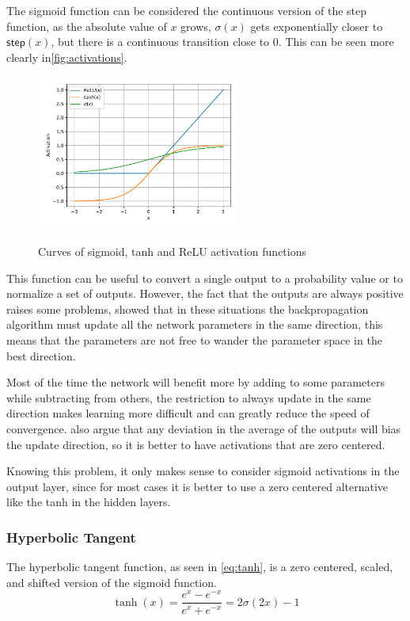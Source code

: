 The sigmoid function can be considered the continuous version of the step function, as the absolute value of $x$ grows, $\sigma(x)$ gets exponentially closer to $\mathsf{step}(x)$, but there is a continuous transition close to $0$. This can be seen more clearly in\autoref{fig:activations}.
\begin{figure}[hbt]
    \centering
    \caption{Curves of sigmoid, tanh and ReLU activation functions}
    \includegraphics[width=0.6\textwidth]{chapters/NeuralNets/figures/Activations.pdf}
    \label{fig:activations}
\end{figure}

This function can be useful to convert a single output to a probability value or to normalize a set of outputs. However, the fact that the outputs are always positive raises some problems, \textcite{efficientBackprop2012} showed that in these situations the backpropagation algorithm must update all the network parameters in the same direction, this means that the parameters are not free to wander the parameter space in the best direction.

Most of the time the network will benefit more by adding to some parameters while subtracting from others, the restriction to always update in the same direction makes learning more difficult and can greatly reduce the speed of convergence. \textcite{efficientBackprop2012} also argue that any deviation in the average of the outputs will bias the update direction, so it is better to have activations that are zero centered.

Knowing this problem, it only makes sense to consider sigmoid activations in the output layer, since for most cases it is better to use a zero centered alternative like the \gls{tanh} in the hidden layers.

\subsubsection{Hyperbolic Tangent}
The hyperbolic tangent function, as seen in \autoref{eq:tanh}, is a zero centered, scaled, and shifted version of the sigmoid function.
\begin{equation} \label{eq:tanh}
    \tanh(x) = \frac{e^x - e^{-x}}{e^x + e^{-x}} = 2\sigma(2x) - 1
\end{equation}

